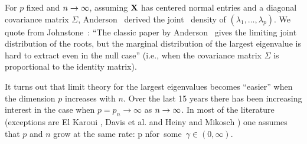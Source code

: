 For $p$ fixed and $n \to \infty$, assuming
${\mathbf X}$ has centered normal entries and a diagonal covariance matrix $\Sigma$,
Anderson~\cite{anderson:1963}  derived the joint \asy\ density of $(\lambda_1, \ldots, \lambda_p)$.
We quote from Johnstone~\cite{johnstone:2001}:
``The classic paper by Anderson~\cite{anderson:1963} gives the limiting joint distribution of the roots, but the
marginal distribution of the largest eigenvalue is hard to extract even in the null case'' (i.e., when the covariance matrix $\Sigma$ is
proportional to the identity matrix).

It turns out that limit theory for the largest eigenvalues becomes ``easier''
when the dimension $p$ increases with $n$.
Over the last 15 years there has been increasing interest in the case when $p=p_n\to\infty$ as $n \to \infty$. In most of
the literature (exceptions are El Karoui \cite{elkaroui:2003}, Davis et al. \cite{davis:mikosch:pfaffel:2015,davis:pfaffel:stelzer:2014} and Heiny and Mikosch
\cite{heiny:mikosch:2015:iid})
one assumes that $p$ and $n$ grow at the same rate:
\beam\label{eq:gamma}
\dfrac p n\to \gamma\qquad \mbox{for some $\gamma \in (0,\infty)$.}
\eeam

